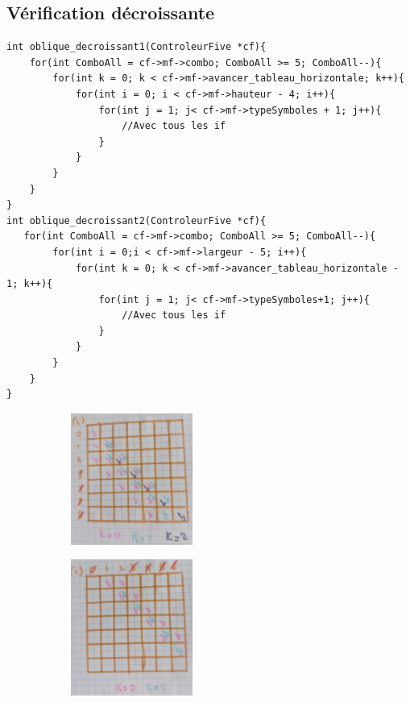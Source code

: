 \documentclass[a4paper, 11pt, oneside]{article}
\begin{document}
\subsection{Vérification décroissante}
\begin{lstlisting}
int oblique_decroissant1(ControleurFive *cf){
    for(int ComboAll = cf->mf->combo; ComboAll >= 5; ComboAll--){
        for(int k = 0; k < cf->mf->avancer_tableau_horizontale; k++){
            for(int i = 0; i < cf->mf->hauteur - 4; i++){
                for(int j = 1; j< cf->mf->typeSymboles + 1; j++){
                    //Avec tous les if
                }
            }
        }
    }
}
int oblique_decroissant2(ControleurFive *cf){
   for(int ComboAll = cf->mf->combo; ComboAll >= 5; ComboAll--){
        for(int i = 0;i < cf->mf->largeur - 5; i++){
            for(int k = 0; k < cf->mf->avancer_tableau_horizontale - 1; k++){
                for(int j = 1; j< cf->mf->typeSymboles+1; j++){
                    //Avec tous les if
                }
            }
        }
    }
}
\end{lstlisting}

\begin{figure}[!h]
    \centering
    \begin{subfigure}[]{}
        \includegraphics[width=4cm]{./images/decroissant1.jpg}
    \end{subfigure}
    \begin{subfigure}[]{}
        \includegraphics[width=4cm]{./images/decroissant2.jpg}
    \end{subfigure}
\end{figure}
    
\end{document}
